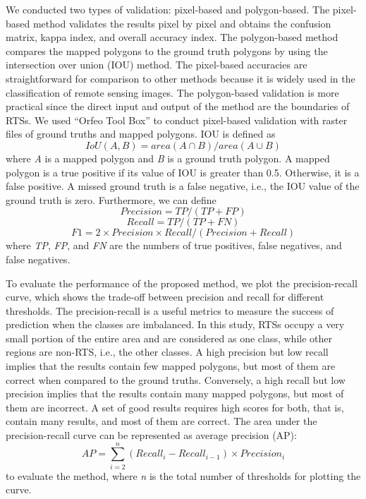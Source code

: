 \documentclass[preprint,12pt,authoryear]{elsarticle}
\begin{document}
We conducted two types of validation: pixel-based and polygon-based. The pixel-based method validates the results pixel by pixel and obtains the confusion matrix, kappa index, and overall accuracy index. The polygon-based method compares the mapped polygons to the ground truth polygons by using the intersection over union (IOU) method. The pixel-based accuracies are straightforward for comparison to other methods because it is widely used in the classification of remote sensing images. The polygon-based validation is more practical since the direct input and output of the method are the boundaries of RTSs. We used “Orfeo Tool Box” \citep{inglada2009orfeo} to conduct pixel-based validation with raster files of ground truths and mapped polygons. IOU is defined as 
\begin{equation}
IoU(A,B)=area(A \cap B)/area(A \cup B)
\label{equ_iou}
\end{equation}
where \emph{A} is a mapped polygon and \emph{B} is a ground truth polygon. A mapped polygon is a true positive if its value of IOU is greater than 0.5. Otherwise, it is a false positive. A missed ground truth is a false negative, i.e., the IOU value of the ground truth is zero. Furthermore, we can define
\begin{equation}
Precision=TP/(TP+FP)
\label{equ_precision}
\end{equation}
\begin{equation}
Recall=TP/(TP+FN)
\label{equ_recall}
\end{equation}
\begin{equation}
F1=2 \times Precision \times Recall / (Precision + Recall)
\label{equ_f1score}
\end{equation}
where \emph{TP}, \emph{FP}, and \emph{FN} are the numbers of true positives, false negatives, and false negatives. 

To evaluate the performance of the proposed method, we plot the precision-recall curve, which shows the trade-off between precision and recall for different thresholds. The precision-recall is a useful metrics to measure the success of prediction when the classes are imbalanced. In this study, RTSs occupy a very small portion of the entire area and are considered as one class, while other regions are non-RTS, i.e., the other classes. A high precision but low recall implies that the results contain few mapped polygons, but most of them are correct when compared to the ground truths. Conversely, a high recall but low precision implies that the results contain many mapped polygons, but most of them are incorrect. A set of good results requires high scores for both, that is, contain many results, and most of them are correct. The area under the precision-recall curve can be represented as average precision (AP):
\begin{equation}
AP=\sum_{i=2}^{n} (Recall_i - Recall_{i-1})\times Precision_i 
\label{equ_ap}
\end{equation}
to evaluate the method, where \emph{n} is the total number of thresholds for plotting the curve. 
\end{document}

